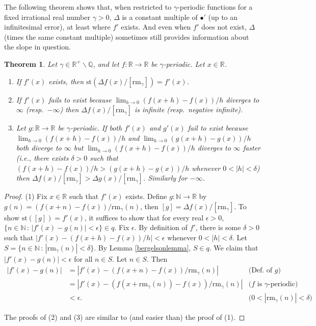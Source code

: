 \documentclass[microtype]{jloganal}
\newtheorem{theorem}{Theorem}
\def\RM{\mathrm{rm}}
\begin{document}
The following theorem shows that, when restricted to $\gamma$-periodic functions
for a fixed irrational real number $\gamma>0$, $\Delta$ is a constant multiple of
$\bullet'$ (up to an infinitesimal error), at least where $f'$ exists.
And even when $f'$ does not exist, $\Delta$ (times the same constant multiple)
sometimes still provides information about the slope in question.


\begin{theorem}
\label{trickygammatheorem}
    Let $\gamma\in\mathbb R^+\backslash \mathbb Q$, and let
    $f:\mathbb R\to\mathbb R$ be $\gamma$-periodic. Let $x\in\mathbb R$.
    \begin{enumerate}
        \item
        If $f'(x)$ exists, then
        $\mathrm{st}(\Delta f(x)/[\RM_\gamma])=f'(x)$.
        \item
        If $f'(x)$ fails to exist because $\lim_{h\to 0}(f(x+h)-f(x))/h$
        diverges to $\infty$ (resp.\ $-\infty$) then $\Delta f(x)/[\RM_\gamma]$
        is infinite (resp.\ negative infinite).
        \item
        Let $g:\mathbb R\to\mathbb R$ be $\gamma$-periodic.
        If both $f'(x)$ and $g'(x)$ fail to exist because
        $\lim_{h\to 0}(f(x+h)-f(x))/h$ and $\lim_{h\to 0}(g(x+h)-g(x))/h$
        both diverge to $\infty$ but $\lim_{h\to 0}(f(x+h)-f(x))/h$ diverges
        to $\infty$ faster (i.e., there exists $\delta>0$ such that
        $(f(x+h)-f(x))/h>(g(x+h)-g(x))/h$ whenever $0<|h|<\delta$) then
        $\Delta f(x)/[\RM_\gamma]>\Delta g(x)/[\RM_\gamma]$. Similarly for $-\infty$.
    \end{enumerate}
\end{theorem}

\begin{proof}
    (1) Fix $x\in \mathbb R$ such that $f'(x)$ exists.
    Define $g:\mathbb N\to\mathbb R$ by
    $g(n)=(f(x+n)-f(x))/\RM_\gamma(n)$,
    then $[g]=\Delta f(x)/[\RM_\gamma]$.
    To show $\mathrm{st}([g])=f'(x)$,
    it suffices to show that for every real $\epsilon>0$,
    $\{n\in\mathbb N\,:\,|f'(x)-g(n)|<\epsilon\}\in q$.
    Fix $\epsilon$.
    By definition of $f'$, there is some $\delta>0$
    such that
    $\left|f'(x)-(f(x+h)-f(x))/h\right|<\epsilon$
    whenever $0<|h|<\delta$.
    Let $S=\{n\in\mathbb N\,:\, |\RM_\gamma(n)|<\delta\}$.
    By Lemma \ref{bergelsonlemma}, $S\in q$.
    We claim that $|f'(x)-g(n)|<\epsilon$ for all $n\in S$.
    Let $n\in S$. Then
    \begin{align*}
        |f'(x)-g(n)|
            &= |f'(x)-(f(x+n)-f(x))/\RM_\gamma(n)|
                &\mbox{(Def.\ of $g$)}\\
            &= |f'(x)
                -(f(x+\RM_\gamma(n))-f(x))/\RM_\gamma(n)|
                &\mbox{($f$ is $\gamma$-periodic)}\\
            &< \epsilon.
                &\mbox{($0<|\RM_\gamma(n)|<\delta$)}
    \end{align*}

    The proofs of (2) and (3) are similar to (and easier than) the proof of (1).
\end{proof}
\end{document}
